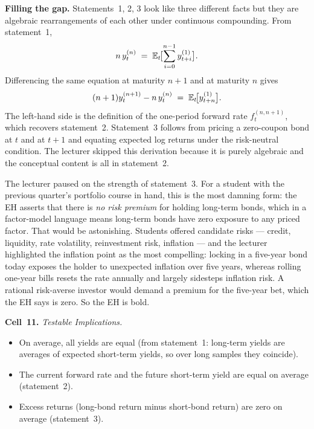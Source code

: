 \begin{tipblock}
\textbf{Filling the gap.} Statements~1, 2, 3 look like three different facts
but they are algebraic rearrangements of each other under continuous
compounding. From statement~1,
\[
   n\,y^{(n)}_t \;=\; \mathbb{E}_t\!\bigl[\sum_{i=0}^{n-1}y^{(1)}_{t+i}\bigr].
\]
Differencing the same equation at maturity $n+1$ and at maturity $n$ gives
\[
   (n+1)y^{(n+1)}_t - n\,y^{(n)}_t \;=\; \mathbb{E}_t\!\bigl[y^{(1)}_{t+n}\bigr].
\]
The left-hand side is the definition of the one-period forward rate
$f_t^{(n,n+1)}$, which recovers statement~2. Statement~3 follows from pricing
a zero-coupon bond at $t$ and at $t+1$ and equating expected log returns under
the risk-neutral condition. The lecturer skipped this derivation because it
is purely algebraic and the conceptual content is all in statement~2.
\end{tipblock}

The lecturer paused on the strength of statement~3. For a student with the
previous quarter's portfolio course in hand, this is the most damning form:
the EH asserts that there is \emph{no risk premium} for holding long-term
bonds, which in a factor-model language means long-term bonds have zero
exposure to any priced factor. That would be astonishing. Students offered
candidate risks --- credit, liquidity, rate volatility, reinvestment risk,
inflation --- and the lecturer highlighted the inflation point as the most
compelling: locking in a five-year bond today exposes the holder to unexpected
inflation over five years, whereas rolling one-year bills resets the rate
annually and largely sidesteps inflation risk. A rational risk-averse investor
would demand a premium for the five-year bet, which the EH says is zero. So
the EH is bold.

\begin{keyblock}
\textbf{Cell~11.} \emph{Testable Implications.}\\
\begin{itemize}
  \item On average, all yields are equal (from statement~1: long-term yields
        are averages of expected short-term yields, so over long samples they
        coincide).
  \item The current forward rate and the future short-term yield are equal on
        average (statement~2).
  \item Excess returns (long-bond return minus short-bond return) are zero on
        average (statement~3).
\end{itemize}
\end{keyblock}

